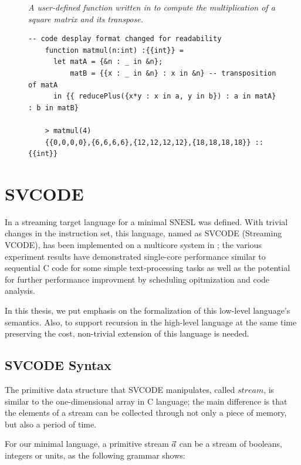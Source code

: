 \begin{figure}[H]\large
	\begin{example}\emph{A user-defined function  written in \mysnesl to compute the multiplication of a square matrix and its transpose.}
	\end{example}
	\begin{lstlisting}[style = nesl-style]
	-- code desplay format changed for readability
	function matmul(n:int) :{{int}} = 
  	  let matA = {&n : _ in &n};
	      matB = {{x : _ in &n} : x in &n} -- transposition of matA
	  in {{ reducePlus({x*y : x in a, y in b}) : a in matA} : b in matB}
	
	> matmul(4)
	{{0,0,0,0},{6,6,6,6},{12,12,12,12},{18,18,18,18}} :: {{int}}
	\end{lstlisting}
\end{figure}





\section{SVCODE}
In \cite{Fmaster} a streaming target language for a minimal SNESL was defined.
With trivial changes in the instruction set, this language, named as SVCODE (Streaming VCODE), has been implemented on a multicore system in \cite{Fphd}; the various experiment results
have demonstrated single-core performance similar to sequential C code for some simple 
text-processing tasks as well as the
potential for further performance improvment by scheduling opitmization and code analysis.

In this thesis, we put emphasis on the formalization of this low-level language's semantics.
Also, to support recursion in the high-level language at the same time preserving the cost, non-trivial extension of this language is needed. 

\subsection{SVCODE Syntax}
The primitive data structure that SVCODE manipulates, called $stream$, is similar to the one-dimensional array in C language; the main difference is that the elements of a stream can
be collected through not only a piece of memory, but also a period of time. 


For our minimal language, a primitive stream $\vec a$ can be a stream of booleans, integers or units, as the following grammar shows:

